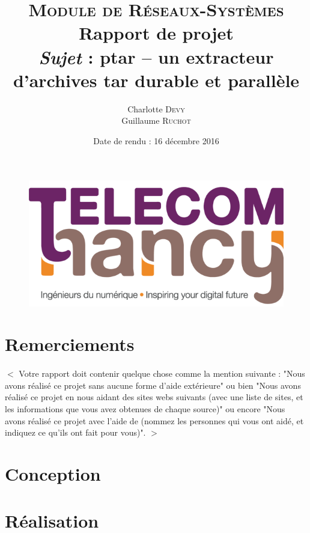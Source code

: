 \documentclass[french,12pt,a4paper,titlepage]{article}
\title{%
  {\Huge \scshape Module de Réseaux-Systèmes}\\
  \vspace{2.5cm}
  {\Huge \textbf{Rapport de projet}}\\
  {\emph{Sujet} : ptar – un extracteur d’archives tar durable et
parallèle}\\ \vspace{2.5cm}}
\author{Charlotte {\scshape Devy}\\Guillaume {\scshape Ruchot}}
\date{Date de rendu : 16 décembre 2016}
\begin{document}
\begin{titlepage}
	\begin{figure}[t]
		\includegraphics[scale=0.3]{Telecom_nancy.png}
	\end{figure}
\end{titlepage}
\maketitle

\tableofcontents

\newpage

\section*{Remerciements}  
\paragraph{} $ < $ Votre rapport doit contenir quelque chose comme la mention suivante : "Nous avons réalisé ce projet sans aucune forme d’aide extérieure" ou bien "Nous avons réalisé ce projet en nous aidant des sites webs suivants (avec une liste de sites, et les informations que vous avez obtenues de chaque source)" ou encore "Nous avons réalisé ce projet avec l’aide de (nommez les personnes qui vous ont aidé, et indiquez ce qu’ils ont fait pour vous)". $ > $

\newpage

\section{Conception}

\newpage

\section{Réalisation}
\end{document}
